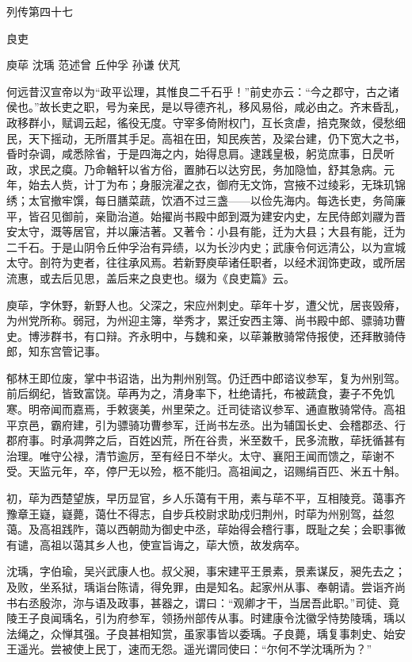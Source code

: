 \documentclass[12pt,UTF8]{ctexbook}
\begin{document}
列传第四十七

良吏

庾荜 沈瑀 范述曾 丘仲孚 孙谦 伏芃

何远昔汉宣帝以为“政平讼理，其惟良二千石乎！”前史亦云：“今之郡守，古之诸侯也。”故长吏之职，号为亲民，是以导德齐礼，移风易俗，咸必由之。齐末昏乱，政移群小，赋调云起，徭役无度。守宰多倚附权门，互长贪虐，掊克聚敛，侵愁细民，天下摇动，无所厝其手足。高祖在田，知民疾苦，及梁台建，仍下宽大之书，昏时杂调，咸悉除省，于是四海之内，始得息肩。逮践皇极，躬览庶事，日昃听政，求民之瘼。乃命輶轩以省方俗，置肺石以达穷民，务加隐恤，舒其急病。元年，始去人赀，计丁为布；身服浣濯之衣，御府无文饰，宫掖不过绫彩，无珠玑锦绣；太官撤牢馔，每日膳菜蔬，饮酒不过三盏——以俭先海内。每选长吏，务简廉平，皆召见御前，亲勖治道。始擢尚书殿中郎到溉为建安内史，左民侍郎刘鬷为晋安太守，溉等居官，并以廉洁著。又著令：小县有能，迁为大县；大县有能，迁为二千石。于是山阴令丘仲孚治有异绩，以为长沙内史；武康令何远清公，以为宣城太守。剖符为吏者，往往承风焉。若新野庾荜诸任职者，以经术润饰吏政，或所居流惠，或去后见思，盖后来之良吏也。缀为《良吏篇》云。

庾荜，字休野，新野人也。父深之，宋应州刺史。荜年十岁，遭父忧，居丧毁瘠，为州党所称。弱冠，为州迎主簿，举秀才，累迁安西主簿、尚书殿中郎、骠骑功曹史。博涉群书，有口辩。齐永明中，与魏和亲，以荜兼散骑常侍报使，还拜散骑侍郎，知东宫管记事。

郁林王即位废，掌中书诏诰，出为荆州别驾。仍迁西中郎谘议参军，复为州别驾。前后纲纪，皆致富饶。荜再为之，清身率下，杜绝请托，布被蔬食，妻子不免饥寒。明帝闻而嘉焉，手敕褒美，州里荣之。迁司徒谘议参军、通直散骑常侍。高祖平京邑，霸府建，引为骠骑功曹参军，迁尚书左丞。出为辅国长史、会稽郡丞、行郡府事。时承凋弊之后，百姓凶荒，所在谷贵，米至数千，民多流散，荜抚循甚有治理。唯守公禄，清节逾厉，至有经日不举火。太守、襄阳王闻而馈之，荜谢不受。天监元年，卒，停尸无以殓，柩不能归。高祖闻之，诏赐绢百匹、米五十斛。

初，荜为西楚望族，早历显官，乡人乐蔼有干用，素与荜不平，互相陵竞。蔼事齐豫章王嶷，嶷薨，蔼仕不得志，自步兵校尉求助戍归荆州，时荜为州别驾，益忽蔼。及高祖践阼，蔼以西朝勋为御史中丞，荜始得会稽行事，既耻之矣；会职事微有谴，高祖以蔼其乡人也，使宣旨诲之，荜大愤，故发病卒。

沈瑀，字伯瑜，吴兴武康人也。叔父昶，事宋建平王景素，景素谋反，昶先去之；及败，坐系狱，瑀诣台陈请，得免罪，由是知名。起家州从事、奉朝请。尝诣齐尚书右丞殷沵，沵与语及政事，甚器之，谓曰：“观卿才干，当居吾此职。”司徒、竟陵王子良闻瑀名，引为府参军，领扬州部传从事。时建康令沈徽孚恃势陵瑀，瑀以法绳之，众惮其强。子良甚相知赏，虽家事皆以委瑀。子良薨，瑀复事刺史、始安王遥光。尝被使上民丁，速而无怨。遥光谓同使曰：“尔何不学沈瑀所为？”
\end{document}
